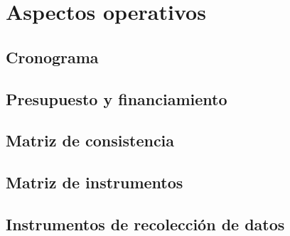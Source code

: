 \chapter{Aspectos operativos}
\section{Cronograma}
\section{Presupuesto y financiamiento}
\section{Matriz de consistencia}
\section{Matriz de instrumentos}
\section{Instrumentos de recolecci\'on de datos}
